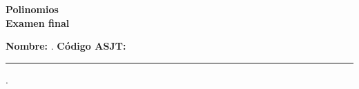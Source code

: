 \begin{center} \textbf
{
    \Large Polinomios \\ \vspace{2mm}Examen final
}
\end{center}

\textbf{Nombre:} \hrulefill. \textbf{ Código ASJT:} \rule{2cm}{0.1mm}.
\vspace{-4mm}

